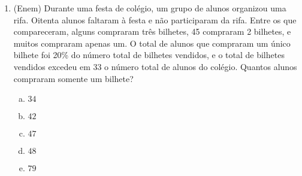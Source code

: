 \documentclass[a4paper,14pt]{article}
\begin{document}
\begin{multicols}{2}
\begin{enumerate}
\begin{enumerate}[a)]
	        \end{enumerate}
        \item (Enem) Durante uma festa de colégio, um grupo de alunos organizou uma rifa. Oitenta alunos faltaram à festa e não participaram da rifa. Entre os que compareceram, alguns compraram três bilhetes, 45 compraram 2 bilhetes, e muitos compraram apenas um. O total de alunos que compraram um único bilhete foi 20\% do número total de bilhetes vendidos, e o total de bilhetes vendidos excedeu em 33 o número total de alunos do colégio. Quantos alunos compraram somente um bilhete?
	        \begin{enumerate}[a)]
	        	\item $34$
	        	\item $42$
	        	\item $47$
	        	\item $48$
	        	\item $79$
	        \end{enumerate}	
        $~$ \\ $~$ \\ $~$ \\ $~$ \\ $~$ \\ $~$ \\ $~$ \\ $~$ \\ $~$ \\ $~$ \\ $~$ \\ $~$ \\ $~$ \\  $~$ \\  $~$ \\  $~$ \\  $~$ \\
	    \end{enumerate}
    \end{multicols}
\end{document}
